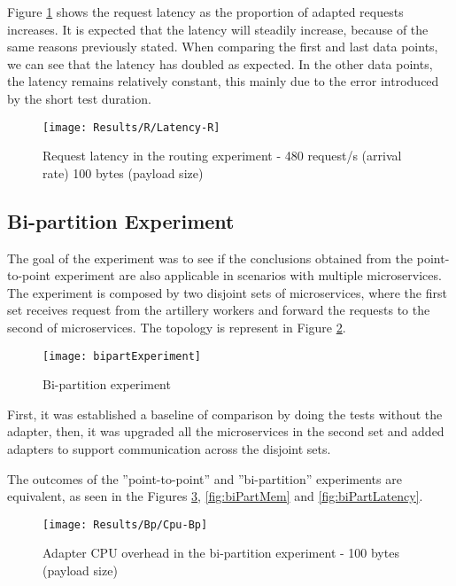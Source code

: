 Figure \ref{fig:routLatency} shows the request latency as the proportion of adapted requests increases.
It is expected that the latency will steadily increase, because of the same reasons previously stated.
When comparing the first and last data points, we can see that the latency has doubled as expected.
In the other data points, the latency remains relatively constant, this mainly due to the error introduced by the short test duration.

\begin{figure}[htbp]
    \centering
    \centerline{\texttt{[image: Results/R/Latency-R]}}
    \caption{Request latency in the routing experiment - 480 request/s (arrival rate) 100 bytes (payload size)}
    \label{fig:routLatency}
\end{figure}

\subsection{Bi-partition Experiment}

The goal of the experiment was to see if the conclusions obtained from the point-to-point experiment are also applicable in scenarios with multiple microservices.
The experiment is composed by two disjoint sets of microservices, where the first set receives request from the artillery workers and forward the requests to the second of microservices.
The topology is represent in Figure \ref{fig:biPart}.

\begin{figure}[htbp]
    \centering
    \centerline{\texttt{[image: bipartExperiment]}}
    \caption{Bi-partition experiment}
    \label{fig:biPart}
\end{figure}

First, it was established a baseline of comparison by doing the tests without the adapter,
then, it was upgraded all the microservices in the second set and added adapters to support communication across the disjoint sets.

The outcomes of the ''point-to-point'' and ''bi-partition'' experiments are equivalent, as seen in the Figures \ref{fig:biPartCPU}, \ref{fig:biPartMem} and \ref{fig:biPartLatency}.

\begin{figure}[htbp]
    \centering
    \centerline{\texttt{[image: Results/Bp/Cpu-Bp]}}
    \caption{Adapter CPU overhead in the bi-partition experiment - 100 bytes (payload size)}
    \label{fig:biPartCPU}
\end{figure}

